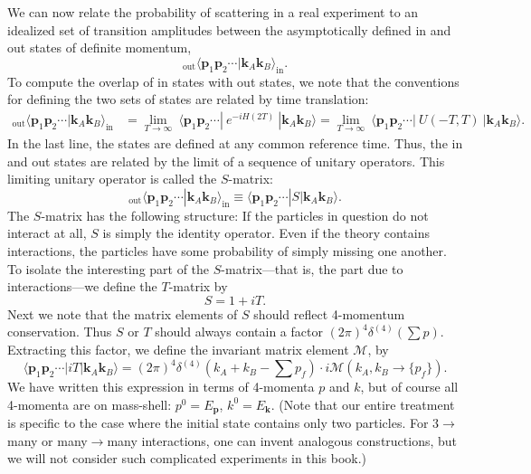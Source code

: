 We can now relate the probability of scattering in a real experiment to an
idealized set of transition amplitudes between the asymptotically defined in
and out states of definite momentum,
\begin{equation}
  {}_{\mathrm{out}}\langle \mathbf{p}_1\mathbf{p}_2\cdots
    |\mathbf{k}_A\mathbf{k}_B\rangle_{\mathrm{in}} .
  \label{eq:4.69}
\end{equation}
To compute the overlap of in states with out states, we note that the
conventions for defining the two sets of states are related by time
translation:
\begin{equation}
  \begin{aligned}
    {}_{\mathrm{out}}\langle \mathbf{p}_1\mathbf{p}_2\cdots
      |\mathbf{k}_A\mathbf{k}_B\rangle_{\mathrm{in}}
    &= \lim_{T\to\infty}\ \langle \mathbf{p}_1\mathbf{p}_2\cdots|
      \ e^{-iH(2T)}\ |\mathbf{k}_A\mathbf{k}_B\rangle
    = \lim_{T\to\infty}\ \langle \mathbf{p}_1\mathbf{p}_2\cdots|
      \ U(-T,T)\ |\mathbf{k}_A\mathbf{k}_B\rangle .
  \end{aligned}
  \label{eq:4.70}
\end{equation}
In the last line, the states are defined at any common reference time.  Thus,
the in and out states are related by the limit of a sequence of unitary
operators.  This limiting unitary operator is called the $S$-matrix:
\begin{equation}
  {}_{\mathrm{out}}\langle \mathbf{p}_1\mathbf{p}_2\cdots
    |\mathbf{k}_A\mathbf{k}_B\rangle_{\mathrm{in}}
  \equiv \langle \mathbf{p}_1\mathbf{p}_2\cdots|S|\mathbf{k}_A\mathbf{k}_B\rangle .
  \label{eq:4.71}
\end{equation}
The $S$-matrix has the following structure: If the particles in question do
not interact at all, $S$ is simply the identity operator.  Even if the theory
contains interactions, the particles have some probability of simply missing
one another.  To isolate the interesting part of the $S$-matrix---that is,
the part due to interactions---we define the $T$-matrix by
\begin{equation}
  S = 1 + iT .
  \label{eq:4.72}
\end{equation}
Next we note that the matrix elements of $S$ should reflect 4-momentum
conservation.  Thus $S$ or $T$ should always contain a factor
$(2\pi)^4\delta^{(4)}(\sum p)$.  Extracting this factor, we define the
invariant matrix element $\mathcal{M}$, by
\begin{equation}
  \langle \mathbf{p}_1\mathbf{p}_2\cdots|iT|\mathbf{k}_A\mathbf{k}_B\rangle
    = (2\pi)^4\delta^{(4)}(k_A+k_B-\textstyle\sum p_f)
      \cdot i\mathcal{M}(k_A, k_B \to \{p_f\}) .
  \label{eq:4.73}
\end{equation}
We have written this expression in terms of 4-momenta $p$ and $k$, but of
course all 4-momenta are on mass-shell: $p^0 = E_{\mathbf{p}}$,
$k^0 = E_{\mathbf{k}}$.  (Note that our entire treatment is specific to the
case where the initial state contains only two particles.  For $3\to$many or
many$\to$many interactions, one can invent analogous constructions, but we
will not consider such complicated experiments in this book.)


